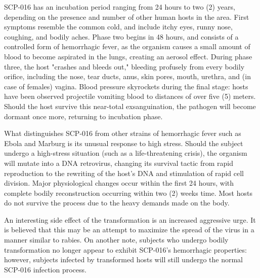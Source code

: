 SCP-016 has an incubation period ranging from 24 hours to two (2) years, depending on the presence and number of other human hosts in the area. First symptoms resemble the common cold, and include itchy eyes, runny nose, coughing, and bodily aches. Phase two begins in 48 hours, and consists of a controlled form of hemorrhagic fever, as the organism causes a small amount of blood to become aspirated in the lungs, creating an aerosol effect. During phase three, the host "crashes and bleeds out," bleeding profusely from every bodily orifice, including the nose, tear ducts, anus, skin pores, mouth, urethra, and (in case of females) vagina. Blood pressure skyrockets during the final stage: hosts have been observed projectile vomiting blood to distances of over five (5) meters. Should the host survive this near-total exsanguination, the pathogen will become dormant once more, returning to incubation phase.

What distinguishes SCP-016 from other strains of hemorrhagic fever such as Ebola and Marburg is its unusual response to high stress. Should the subject undergo a high-stress situation (such as a life-threatening crisis), the organism will mutate into a DNA retrovirus, changing its survival tactic from rapid reproduction to the rewriting of the host's DNA and stimulation of rapid cell division. Major physiological changes occur within the first 24 hours, with complete bodily reconstruction occurring within two (2) weeks time. Most hosts do not survive the process due to the heavy demands made on the body.

An interesting side effect of the transformation is an increased aggressive urge. It is believed that this may be an attempt to maximize the spread of the virus in a manner similar to rabies. On another note, subjects who undergo bodily transformation no longer appear to exhibit SCP-016's hemorrhagic properties: however, subjects infected by transformed hosts will still undergo the normal SCP-016 infection process.
\newpage
\begin{flushleft}
\end{flushleft}

